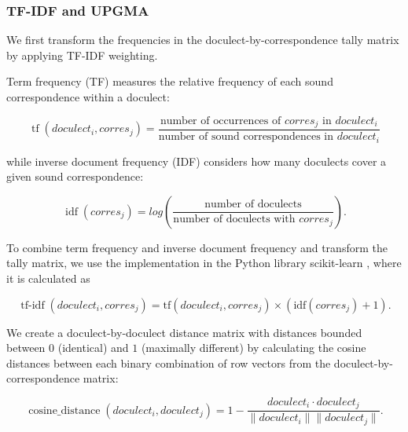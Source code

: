 \documentclass[a4paper]{article}
\begin{document}
\subsubsection{TF-IDF and UPGMA}

We first transform the frequencies
in the doculect-by-correspondence tally matrix
by applying TF-IDF weighting.


Term frequency (TF) measures the relative frequency
of each sound correspondence within a doculect:

\begin{equation*}
\operatorname{tf}(doculect_i, corres_j) =
\frac{\text{number of occurrences of } corres_j \text{ in } doculect_i}
{\text{number of sound correspondences in } doculect_i}
\end{equation*}

while inverse document frequency (IDF)
considers how many doculects cover a given
sound correspondence:

\begin{equation*}
\operatorname{idf}(corres_j) =
log(
\frac{\text{number of doculects}}
{\text{number of doculects with } corres_j}
).
\end{equation*}

To combine term frequency and inverse document frequency
and transform the tally matrix, 
we use the implementation in the Python library scikit-learn
\citep{pedregosa2011scikit-learn},
where it is calculated as

\begin{equation*}
\operatorname{tf-idf}(doculect_i, corres_j) =
\text{tf}(doculect_i, corres_j)
\times
(
\text{idf}(corres_j)
+ 1).
\end{equation*}


We create a doculect-by-doculect distance matrix
with distances bounded between $0$ (identical) and $1$ (maximally different)
by calculating the cosine distances between each
binary combination of row vectors from the doculect-by-correspondence matrix:

\begin{equation*}
\operatorname{cosine\_distance}(doculect_i,doculect_j) =
1 -
\frac{doculect_i \cdot doculect_j}{\lVert doculect_i \rVert \lVert doculect_j \rVert}
.
\end{equation*}
\end{document}
